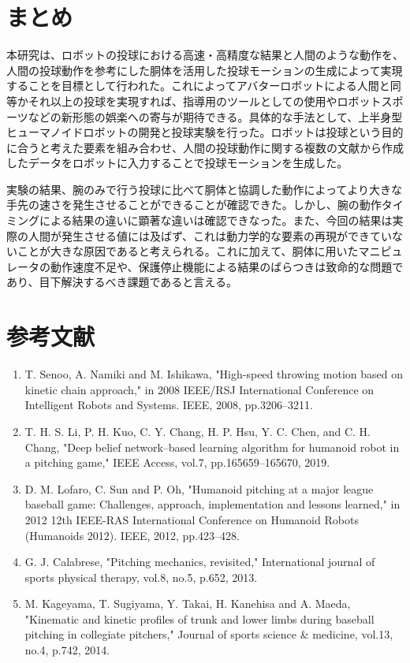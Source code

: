 \documentclass[9pt, twocolumn, a4paper]{jsarticle_kijou}
\begin{document}
\section{まとめ}
本研究は、ロボットの投球における高速・高精度な結果と人間のような動作を、人間の投球動作を参考にした胴体を活用した投球モーションの生成によって実現することを目標として行われた。これによってアバターロボットによる人間と同等かそれ以上の投球を実現すれば、指導用のツールとしての使用やロボットスポーツなどの新形態の娯楽への寄与が期待できる。具体的な手法として、上半身型ヒューマノイドロボットの開発と投球実験を行った。ロボットは投球という目的に合うと考えた要素を組み合わせ、人間の投球動作に関する複数の文献から作成したデータをロボットに入力することで投球モーションを生成した。\par
実験の結果、腕のみで行う投球に比べて胴体と協調した動作によってより大きな手先の速さを発生させることができることが確認できた。しかし、腕の動作タイミングによる結果の違いに顕著な違いは確認できなった。また、今回の結果は実際の人間が発生させる値には及ばず、これは動力学的な要素の再現ができていないことが大きな原因であると考えられる。これに加えて、胴体に用いたマニピュレータの動作速度不足や、保護停止機能による結果のばらつきは致命的な問題であり、目下解決するべき課題であると言える。\par


\section*{\small 参考文献}{
\small
\begin{enumerate}
\renewcommand{\labelenumi}{\arabic{enumi}).}
  \item T. Senoo, A. Namiki and M. Ishikawa, "High-speed throwing motion based on kinetic chain approach," in 2008 IEEE/RSJ International Conference on Intelligent Robots and Systems. IEEE, 2008, pp.3206–3211.
  \item T. H. S. Li, P. H. Kuo, C. Y. Chang, H. P. Hsu, Y. C. Chen, and C. H. Chang, "Deep belief network–based learning algorithm for humanoid robot in a pitching game," IEEE Access, vol.7, pp.165659–165670, 2019.
  \item D. M. Lofaro, C. Sun and P. Oh, "Humanoid pitching at a major league baseball game: Challenges, approach, implementation and lessons learned," in 2012 12th IEEE-RAS International Conference on Humanoid Robots (Humanoids 2012). IEEE, 2012, pp.423–428.
  \item G. J. Calabrese, "Pitching mechanics, revisited," International journal of sports physical therapy, vol.8, no.5, p.652, 2013.
  \item M. Kageyama, T. Sugiyama, Y. Takai, H. Kanehisa and A. Maeda, "Kinematic and kinetic profiles of trunk and lower limbs during baseball pitching in collegiate pitchers," Journal of
  sports science \& medicine, vol.13, no.4, p.742, 2014.
\end{enumerate}
}
\end{document}
